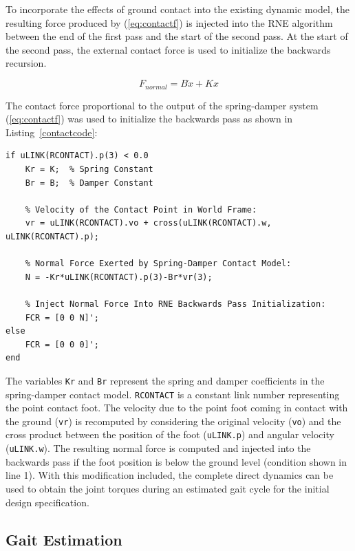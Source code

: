 To incorporate the effects of ground contact into the existing dynamic model, the resulting force produced by (\ref{eq:contactf}) is injected into the RNE algorithm between the end of the first pass and the start of the second pass. At the start of the second pass, the external contact force is used to initialize the backwards recursion. 

\begin{equation}
	\label{eq:contactf}
	F_{normal} = B{\dot{x}} + Kx
\end{equation}

The contact force proportional to the output of the spring-damper system (\ref{eq:contactf}) was used to initialize the backwards pass as shown in Listing~\ref{contactcode}:

\begin{lstlisting}[label=contactcode,caption=Contact force injection in RNE backwards recursion.]
if uLINK(RCONTACT).p(3) < 0.0
	Kr = K;	 % Spring Constant
	Br = B;  % Damper Constant
	
	% Velocity of the Contact Point in World Frame:
	vr = uLINK(RCONTACT).vo + cross(uLINK(RCONTACT).w, uLINK(RCONTACT).p); 
	
	% Normal Force Exerted by Spring-Damper Contact Model:
	N = -Kr*uLINK(RCONTACT).p(3)-Br*vr(3);
	
	% Inject Normal Force Into RNE Backwards Pass Initialization:
	FCR = [0 0 N]';
else
	FCR = [0 0 0]'; 
end
\end{lstlisting}

The variables \texttt{Kr} and \texttt{Br} represent the spring and damper coefficients in the spring-damper contact model. \texttt{RCONTACT} is a constant link number representing the point contact foot. The velocity due to the point foot coming in contact with the ground (\texttt{vr}) is recomputed by considering the original velocity (\texttt{vo}) and the cross product between the position of the foot (\texttt{uLINK.p}) and angular velocity (\texttt{uLINK.w}). The resulting normal force is computed and injected into the backwards pass if the foot position is below the ground level (condition shown in line 1). With this modification included, the complete direct dynamics can be used to obtain the joint torques during an estimated gait cycle for the initial design specification.   



\subsection{Gait Estimation} %
\label{sec:gait_estimation}
	
